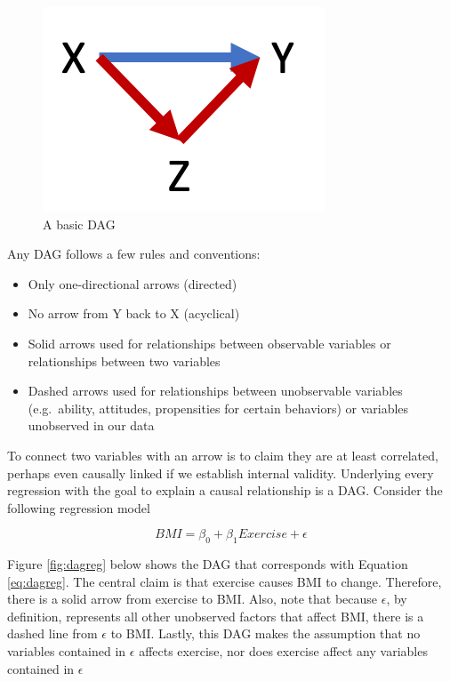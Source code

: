 \documentclass[
]{book}
\providecommand{\tightlist}{%
  \setlength{\itemsep}{0pt}\setlength{\parskip}{0pt}}
\begin{document}
\begin{figure}

{\centering \includegraphics[width=\textwidth]{images/dag_basic} 

}

\caption{A basic DAG}\label{fig:dagbasic}
\end{figure}

Any DAG follows a few rules and conventions:

\begin{itemize}
\tightlist
\item
  Only one-directional arrows (directed)
\item
  No arrow from Y back to X (acyclical)
\item
  Solid arrows used for relationships between observable variables or relationships between two variables
\item
  Dashed arrows used for relationships between unobservable variables (e.g.~ability, attitudes, propensities for certain behaviors) or variables unobserved in our data
\end{itemize}

To connect two variables with an arrow is to claim they are at least correlated, perhaps even causally linked if we establish internal validity. Underlying every regression with the goal to explain a causal relationship is a DAG. Consider the following regression model

\begin{equation}
BMI = \beta_0 + \beta_1Exercise + \epsilon
\label{eq:dagreg}
\end{equation}

Figure \ref{fig:dagreg} below shows the DAG that corresponds with Equation \eqref{eq:dagreg}. The central claim is that exercise causes BMI to change. Therefore, there is a solid arrow from exercise to BMI. Also, note that because \(\epsilon\), by definition, represents all other unobserved factors that affect BMI, there is a dashed line from \(\epsilon\) to BMI. Lastly, this DAG makes the assumption that no variables contained in \(\epsilon\) affects exercise, nor does exercise affect any variables contained in \(\epsilon\)
\end{document}
